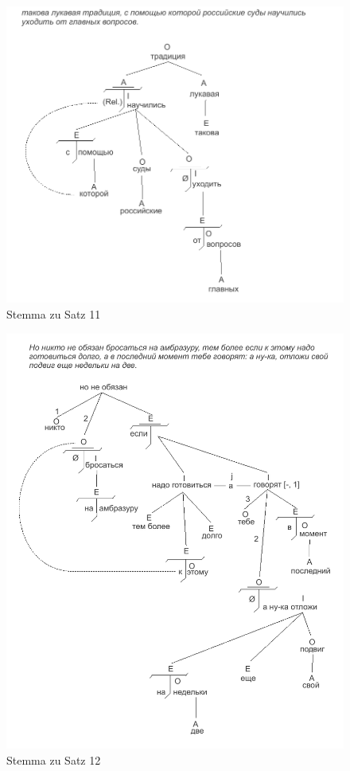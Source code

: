 \begin{figure}
    \begin{center}
        \includegraphics{anhang_a/stemma11}
        \caption{Stemma zu Satz 11}
        \label{fig:stemma11}
    \end{center}
\end{figure}

\begin{figure}
    \begin{center}
        \includegraphics{anhang_a/stemma12}
        \caption{Stemma zu Satz 12}
        \label{fig:stemma12}
    \end{center}
\end{figure}

